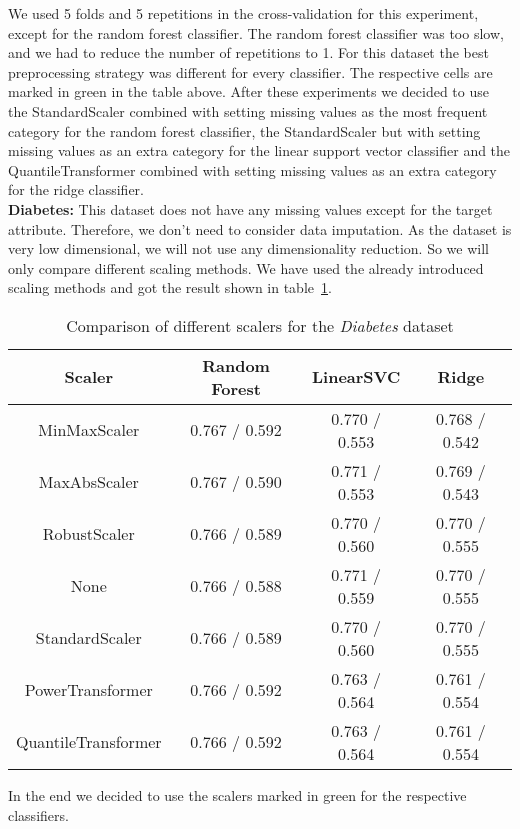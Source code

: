 \documentclass[a4paper,12pt]{article}
\begin{document}
We used 5 folds and 5 repetitions in the cross-validation for this experiment, except for the random forest
classifier. The random forest classifier was too slow, and we had to reduce the number of repetitions to 1.
For this dataset the best
preprocessing strategy was different for every classifier. The respective cells are marked in green in the
table above. After these experiments we decided to use the StandardScaler combined with setting missing
values as the most frequent category for the random forest classifier, the StandardScaler but with setting
missing values as an extra category for the linear support vector classifier and the QuantileTransformer
combined with setting missing values as an extra category for the ridge classifier.\\
\textbf{Diabetes:} This dataset does not have any missing values except for the target attribute. Therefore, we 
 don't need to consider data imputation. As the dataset is very low dimensional, we will not use any dimensionality reduction. 
 So we will only compare different scaling methods. We have used the already introduced scaling methods 
 and got the result shown in table~\ref{table:diabetesscalers}.
 \begin{table}[h!]
\centering
\begin{tabular}{|c|c|c|c|}
\hline
\textbf{Scaler} & \textbf{Random Forest } & \textbf{LinearSVC } & \textbf{Ridge } \\
\hline
MinMaxScaler & \cellcolor[HTML]{C1E1C1} 0.767 / 0.592 & 0.770 / 0.553 & 0.768 / 0.542 \\
\hline
MaxAbsScaler & 0.767 / 0.590 & 0.771 / 0.553 & 0.769 / 0.543 \\
\hline
RobustScaler & 0.766 / 0.589 & 0.770 / 0.560 & 0.770 / 0.555 \\
\hline
None & 0.766 / 0.588 & \cellcolor[HTML]{C1E1C1}0.771 / 0.559 & 0.770 / 0.555 \\
\hline
StandardScaler & 0.766 / 0.589 & 0.770 / 0.560 &\cellcolor[HTML]{C1E1C1} 0.770 / 0.555 \\
\hline
PowerTransformer & 0.766 / 0.592 & 0.763 / 0.564 & 0.761 / 0.554 \\
\hline
QuantileTransformer & 0.766 / 0.592 & 0.763 / 0.564 & 0.761 / 0.554 \\
\hline
\end{tabular}
\caption{Comparison of different scalers for the \textit{Diabetes} dataset}
\label{table:diabetesscalers}
\end{table}
In the end we decided to use the scalers marked in green for the respective classifiers.\\
\end{document}
